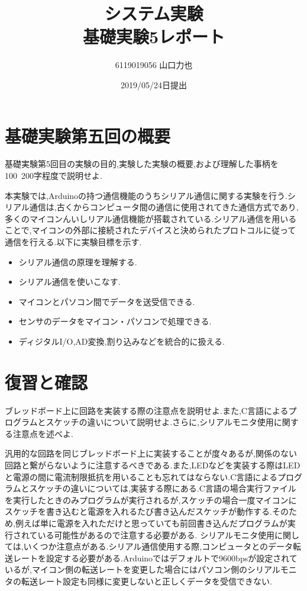 \documentclass{jarticle}
\title{{システム実験}\\基礎実験5レポート}
\author{6119019056 山口力也}
\date{2019/05/24日提出}
\begin{document}
\maketitle

\section{基礎実験第五回の概要}
基礎実験第5回目の実験の目的,実験した実験の概要,および理解した事柄を100~200字程度で説明せよ.

本実験では,Arduinoの持つ通信機能のうちシリアル通信に関する実験を行う.シリアル通信は,古くからコンピュータ間の通信に使用されてきた通信方式であり,多くのマイコンんいしリアル通信機能が搭載されている.シリアル通信を用いることで,マイコンの外部に接続されたデバイスと決められたプロトコルに従って通信を行える.以下に実験目標を示す.
\begin{itemize}
実験目標:
\item シリアル通信の原理を理解する.
\item シリアル通信を使いこなす.
\item マイコンとパソコン間でデータを送受信できる.
\item センサのデータをマイコン・パソコンで処理できる.
\item ディジタルI/O,AD変換,割り込みなどを統合的に扱える.

\end{itemize}

\section{復習と確認}
ブレッドボード上に回路を実装する際の注意点を説明せよ.また,C言語によるプログラムとスケッチの違いについて説明せよ.さらに,シリアルモニタ使用に関する注意点を述べよ.

汎用的な回路を同じブレッドボード上に実装することが度々あるが,関係のない回路と繋がらないように注意するべきである.また,LEDなどを実装する際はLEDと電源の間に電流制限抵抗を用いることも忘れてはならない.C言語によるプログラムとスケッチの違いについては,実装する際にある.C言語の場合実行ファイルを実行したときのみプログラムが実行されるが,スケッチの場合一度マイコンにスケッチを書き込むと電源を入れるたび書き込んだスケッチが動作する.そのため,例えば単に電源を入れただけと思っていても前回書き込んだプログラムが実行されている可能性があるので注意する必要がある.
シリアルモニタ使用に関しては,いくつか注意点がある.シリアル通信使用する際,コンピュータとのデータ転送レートを設定する必要がある.Arduinoではデフォルトで9600bpsが設定されているが,マイコン側の転送レートを変更した場合にはパソコン側のシリアルモニタの転送レート設定も同様に変更しないと正しくデータを受信できない.
\end{document}
